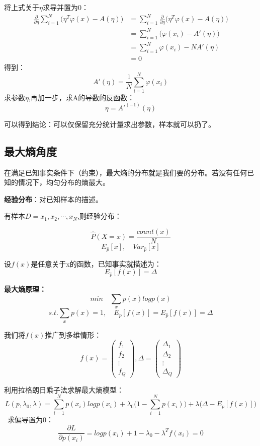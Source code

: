 \documentclass[UTF8]{ctexart} %
\begin{document}
			将上式关于$\eta$求导并置为0：
			\[\begin{aligned}
			\frac{\partial}{\partial\eta}\sum_{i=1}^N\Big(\eta^T\varphi(x)-A(\eta)\Big)&=\sum_{i=1}^N\frac{\partial}{\partial\eta}\Big(\eta^T\varphi(x)-A(\eta)\Big)\\
			&=\sum_{i=1}^N\Big(\varphi(x_i)-A'(\eta)\Big)\\
			&= \sum_{i=1}^N\varphi(x_i)-NA'(\eta)\\
			&=0
			\end{aligned}\]
			得到：
			\[A'(\eta) = \frac{1}{N}\sum_{i=1}^N\varphi(x_i)\]
			求参数$\eta$,再加一步，求A的导数的反函数：
			\[\eta = A'^{(-1)}(\eta)\]
			
			可以得到结论：可以仅保留充分统计量求出参数，样本就可以扔了。
			
		\subsection{最大熵角度}
			在满足已知事实条件下（约束），最大熵的分布就是我们要的分布。若没有任何已知的情况下，均匀分布的熵最大。
			
			\textbf{经验分布}：对已知样本的描述。
			
			有样本$D={x_1,x_2,\cdots, x_N}$,则经验分布：
			
			\[\hat{P}(X=x)=\frac{count(x)}{N}\]
			\[E_{\hat{p}}[x],\quad Var_{\hat{p}}[x]\]
			
			设$f(x)$是任意关于x的函数，已知事实就描述为：
			\[E_{\hat{p}}[f(x)] = \Delta\]
			
			\textbf{最大熵原理：}
			\[min\quad\sum_{x}p(x)logp(x)\]
			\[s.t.\sum_xp(x)=1,\quad E_{p}[f(x)]=E_{\hat{p}}[f(x)]=\Delta\]
			
			我们将$f(x)$推广到多维情形：
			\[f(x)=\begin{pmatrix}
			f_1\\f_2\\\vdots\\f_Q
			\end{pmatrix},
			\Delta =\begin{pmatrix}
			\Delta_1\\\Delta_2\\\vdots\\\Delta_Q
			\end{pmatrix}  \]
			
			利用拉格朗日乘子法求解最大熵模型：
			\[L(p,\lambda_0,\lambda) = \sum_{i=1}^Np(x_i)logp(x_i)+\lambda_0\Big(1-\sum_{i=1}^Np(x_i)\Big)+\lambda\Big(\Delta-E_{p}[f(x)]\Big)\]\
			求偏导置为0：
			\[\frac{\partial L}{\partial p(x_i)} = logp(x_i)+1-\lambda_0-\lambda^Tf(x_i)=0\]
			
\end{document}
